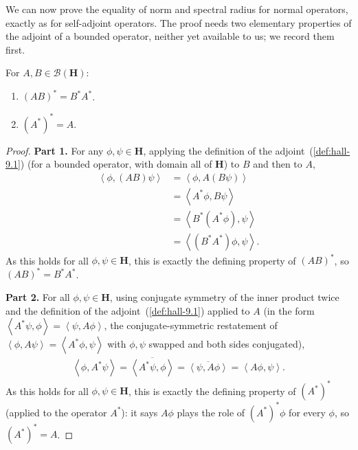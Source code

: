 We can now prove the equality of norm and spectral radius for normal operators, exactly as for self-adjoint operators. The proof needs two elementary properties of the adjoint of a bounded operator, neither yet available to us; we record them first.

\begin{lemma}
    \label{lmm:adjoint-product-and-involution}
    \leanok
    For $A, B \in \mathcal{B}(\mathbf{H})$:
    \begin{enumerate}
        \item $(AB)^* = B^*A^*$.
        \item $(A^*)^* = A$.
    \end{enumerate}
\end{lemma}
\begin{proof}
    \leanok
\textbf{Part 1.} For any $\phi,\psi \in \mathbf{H}$, applying the definition of the adjoint~(\ref{def:hall-9.1}) (for a bounded operator, with domain all of $\mathbf{H}$) to $B$ and then to $A$,
\begin{align}
    \left< \phi, (AB)\psi \right> &= \left< \phi, A(B\psi) \right> \\
                &= \left< A^*\phi, B\psi \right> \\
                &= \left< B^*(A^*\phi), \psi \right> \\
                &= \left< (B^*A^*)\phi, \psi \right>.
\end{align}
As this holds for all $\phi,\psi \in \mathbf{H}$, this is exactly the defining property of $(AB)^*$, so $(AB)^* = B^*A^*$.

\textbf{Part 2.} For all $\phi,\psi \in \mathbf{H}$, using conjugate symmetry of the inner product twice and the definition of the adjoint~(\ref{def:hall-9.1}) applied to $A$ (in the form $\left< A^*\psi,\phi\right> = \left<\psi,A\phi\right>$, the conjugate-symmetric restatement of $\left<\phi,A\psi\right>=\left<A^*\phi,\psi\right>$ with $\phi,\psi$ swapped and both sides conjugated),
\begin{align}
    \left< \phi, A^*\psi \right> = \overline{\left< A^*\psi, \phi \right>} = \overline{\left< \psi, A\phi \right>} = \left< A\phi, \psi \right>.
\end{align}
As this holds for all $\phi,\psi\in\mathbf{H}$, this is exactly the defining property of $(A^*)^*$ (applied to the operator $A^*$): it says $A\phi$ plays the role of $(A^*)^*\phi$ for every $\phi$, so $(A^*)^*=A$.
\end{proof}

